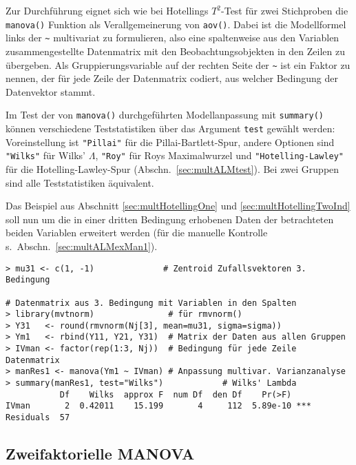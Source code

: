 Zur Durchführung eignet sich wie bei Hotellings $T^{2}$-Test für zwei Stichproben die \lstinline!manova()! Funktion als Verallgemeinerung von \lstinline!aov()!. Dabei ist die Modellformel links der \lstinline!~! multivariat zu formulieren, also eine spaltenweise aus den Variablen zusammengestellte Datenmatrix mit den Beobachtungsobjekten in den Zeilen zu übergeben. Als Gruppierungsvariable auf der rechten Seite der \lstinline!~! ist ein Faktor zu nennen, der für jede Zeile der Datenmatrix codiert, aus welcher Bedingung der Datenvektor stammt.

Im Test der von \lstinline!manova()! durchgeführten Modellanpassung mit \lstinline!summary()! können verschiedene Teststatistiken über das Argument \lstinline!test! gewählt werden: Voreinstellung ist \lstinline!"Pillai"! für die Pillai-Bartlett-Spur, andere Optionen sind \lstinline!"Wilks"! für Wilks' $\Lambda$, \lstinline!"Roy"! für Roys Maximalwurzel und \lstinline!"Hotelling-Lawley"! für die Hotelling-Lawley-Spur (Abschn.\ \ref{sec:multALMtest}). Bei zwei Gruppen sind alle Teststatistiken äquivalent.

Das Beispiel aus Abschnitt \ref{sec:multHotellingOne} und \ref{sec:multHotellingTwoInd} soll nun um die in einer dritten Bedingung erhobenen Daten der betrachteten beiden Variablen erweitert werden (für die manuelle Kontrolle s.\ Abschn.\ \ref{sec:multALMexMan1}).
\begin{lstlisting}
> mu31 <- c(1, -1)              # Zentroid Zufallsvektoren 3. Bedingung

# Datenmatrix aus 3. Bedingung mit Variablen in den Spalten
> library(mvtnorm)               # für rmvnorm()
> Y31   <- round(rmvnorm(Nj[3], mean=mu31, sigma=sigma))
> Ym1   <- rbind(Y11, Y21, Y31)  # Matrix der Daten aus allen Gruppen
> IVman <- factor(rep(1:3, Nj))  # Bedingung für jede Zeile Datenmatrix
> manRes1 <- manova(Ym1 ~ IVman) # Anpassung multivar. Varianzanalyse
> summary(manRes1, test="Wilks")            # Wilks' Lambda
           Df    Wilks  approx F  num Df  den Df    Pr(>F)
IVman       2  0.42011    15.199       4     112  5.89e-10 ***
Residuals  57
\end{lstlisting}

\subsection{Zweifaktorielle MANOVA}
\label{sec:multManova2}

